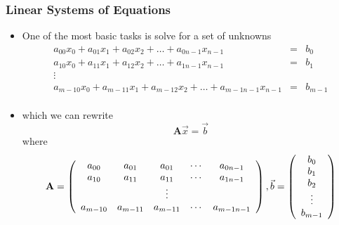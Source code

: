 \documentclass[10pt]{beamer}
\begin{document}
\begin{frame}
  \frametitle{Linear Systems of Equations}
  \begin{itemize}
  \item One of the most basic tasks is solve for a set of unknowns
    \[
      \begin{array}{ccc}
        a_{00} x_0 + a_{01} x_1 + a_{02} x_2 + \ldots + a_{0n-1} x_{n-1} & = & b_0\\
        a_{10} x_0 + a_{11} x_1 + a_{12} x_2 + \ldots + a_{1n-1} x_{n-1} & = & b_1\\
        \vdots && \\
        a_{m-10} x_0 + a_{m-11} x_1 + a_{m-12} x_2 + \ldots + a_{m-1n-1} x_{n-1} & = & b_{m-1}\\
      \end{array}
    \]
    \pause
  \item which we can rewrite
    \[
      \mathbf{A} \vec{x} = \vec{b}
    \]
    where
    \[
      \mathbf{A} = \left(
        \begin{array}{ccccc}
          a_{00} & a_{01} & a_{01} & \cdots & a_{0n-1} \\
          a_{10} & a_{11} & a_{11} & \cdots & a_{1n-1} \\
          & &  \vdots & & \\
          a_{m-10} & a_{m-11} & a_{m-11} & \cdots & a_{m-1n-1} \\
        \end{array}\right), 
      \vspace{1cm} 
      \vec{b} = \left(
        \begin{array}{c}
          b_0 \\ b_1 \\ b_2 \\ \vdots \\ b_{m-1} \\
        \end{array}\right)
    \]    
  \end{itemize}
\end{frame}
\end{document}

